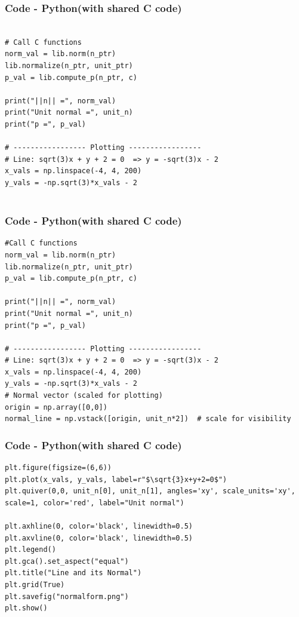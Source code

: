 \documentclass{beamer}
\theoremstyle{remark}
\numberwithin{equation}{section}
\begin{document}
\begin{frame}[fragile]
\frametitle{Code - Python(with shared C code)}
\begin{lstlisting}

# Call C functions
norm_val = lib.norm(n_ptr)
lib.normalize(n_ptr, unit_ptr)
p_val = lib.compute_p(n_ptr, c)

print("||n|| =", norm_val)
print("Unit normal =", unit_n)
print("p =", p_val)

# ----------------- Plotting -----------------
# Line: sqrt(3)x + y + 2 = 0  => y = -sqrt(3)x - 2
x_vals = np.linspace(-4, 4, 200)
y_vals = -np.sqrt(3)*x_vals - 2


\end{lstlisting}
\end{frame}

\begin{frame}[fragile]
\frametitle{Code - Python(with shared C code)}
\begin{lstlisting}
#Call C functions
norm_val = lib.norm(n_ptr)
lib.normalize(n_ptr, unit_ptr)
p_val = lib.compute_p(n_ptr, c)

print("||n|| =", norm_val)
print("Unit normal =", unit_n)
print("p =", p_val)

# ----------------- Plotting -----------------
# Line: sqrt(3)x + y + 2 = 0  => y = -sqrt(3)x - 2
x_vals = np.linspace(-4, 4, 200)
y_vals = -np.sqrt(3)*x_vals - 2
# Normal vector (scaled for plotting)
origin = np.array([0,0])
normal_line = np.vstack([origin, unit_n*2])  # scale for visibility

\end{lstlisting}
\end{frame}

\begin{frame}[fragile]
\frametitle{Code - Python(with shared C code)}
\begin{lstlisting}
plt.figure(figsize=(6,6))
plt.plot(x_vals, y_vals, label=r"$\sqrt{3}x+y+2=0$")
plt.quiver(0,0, unit_n[0], unit_n[1], angles='xy', scale_units='xy', scale=1, color='red', label="Unit normal")

plt.axhline(0, color='black', linewidth=0.5)
plt.axvline(0, color='black', linewidth=0.5)
plt.legend()
plt.gca().set_aspect("equal")
plt.title("Line and its Normal")
plt.grid(True)
plt.savefig("normalform.png")
plt.show()

\end{lstlisting}
\end{frame}
\end{document}
